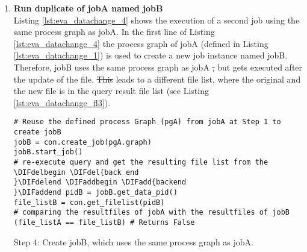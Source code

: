 \documentclass[draft,final]{vutinfth} %
\newenvironment{code}{\captionsetup{type=listing}}{}
\providecommand{\DIFaddtex}[1]{{\protect\color{blue}\uwave{#1}}} %
\providecommand{\DIFdeltex}[1]{{\protect\color{red}\sout{#1}}}                      %
\providecommand{\DIFaddbegin}{} %
\providecommand{\DIFaddend}{} %
\providecommand{\DIFdelbegin}{} %
\providecommand{\DIFdelend}{} %
\providecommand{\DIFadd}[1]{\texorpdfstring{\DIFaddtex{#1}}{#1}} %
\providecommand{\DIFdel}[1]{\texorpdfstring{\DIFdeltex{#1}}{}} %
\begin{document}
\begin{enumerate}
	\begin{code}
		\begin{verbatim}
{'timestamp': '2017-05-08 00:00:00', 
'path': '/eodc/products/copernicus.eu/s2a_prd_msil1c/2017/05/04/
S2A_MSIL1C_20170504T101031_N0205_R022_T32TPR_20170504T101349.zip'}, 
{'timestamp': '2017-05-08 00:00:00',
'path':'/eodc/products/copernicus.eu/s2a_prd_msil1c/2017/05/04/
S2A_MSIL1C_20170504T101031_N0205_R022_T32TQS_20170504T101349.zip', 
{'timestamp': '2017-05-08 00:00:00', 
'path': '/eodc/products/copernicus.eu/s2a_prd_msil1c/2017/05/04/
S2A_MSIL1C_20170504T101031_N0205_R022_T32TQR_20170504T101349.zip'}, 
{'timestamp': '2017-05-08 00:00:00',
'path':'/eodc/products/copernicus.eu/s2a_prd_msil1c/2017/05/04/
S2A_MSIL1C_20170504T101031_N0205_R022_T32TPT_20170504T101349.zip'},
...
		\end{verbatim}
		\caption{First four resulting files of the file list.}
		\label{lst:eva_datachange_rf3}
	\end{code}

	\item \textbf{Run duplicate of jobA named jobB} \\
	Listing \ref{lst:eva_datachange_4} shows the execution of a second job using the same process graph as jobA. In the first line of Listing \ref{lst:eva_datachange_4} the process graph of jobA (defined in Listing \ref{lst:eva_datachange_1}) is used to create a new job instance named jobB. Therefore, jobB uses the same process graph as jobA \DIFdelbegin \DIFdel{, }\DIFdelend but gets executed after the update of the file. \DIFdelbegin \DIFdel{This }\DIFdelend \DIFaddbegin \DIFadd{It }\DIFaddend leads to a different file list, where the original and the new file is in the query result file list (see Listing \ref{lst:eva_datachange_fl3}).
	\begin{code}
		\begin{verbatim}
# Reuse the defined process Graph (pgA) from jobA at Step 1 to create jobB
jobB = con.create_job(pgA.graph)
jobB.start_job()
# re-execute query and get the resulting file list from the \DIFdelbegin \DIFdel{back end
}\DIFdelend \DIFaddbegin \DIFadd{backend
}\DIFaddend pidB = jobB.get_data_pid()
file_listB = con.get_filelist(pidB)
# comparing the resultfiles of jobA with the resultfiles of jobB
(file_listA == file_listB) # Returns False
		\end{verbatim}
		\caption{Step 4: Create jobB, which uses the same process graph as jobA.}
		\label{lst:eva_datachange_4}
	\end{code}


\end{enumerate}
\end{document}

